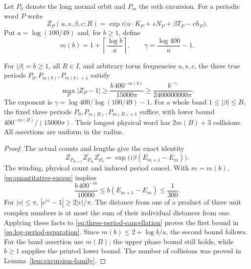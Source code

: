 Let $P_0$ denote the long normal orbit and $P_m$ the $m$th excursion.
For a periodic word $P$ write
\[
 Z_P(u,s,\beta,c;R)
 =\exp i\bigl(u\cdot K_P+sN_P+\beta T_P-ch_P\bigr).
\]
Put $a=\log(100/49)$ and, for $b\ge1$, define
\begin{equation}\label{eq:frequency-period-budget}
 m(b)=1+\left\lceil\frac{\log b}{a}\right\rceil,
 \qquad \gamma=\frac{\log400}{a}-1.
\end{equation}

\begin{theorem}
\label{thm:log-period-separation}
For $|\beta|=b\ge1$, all $R\in I$, and arbitrary torus
frequencies $u,s,c$, the three true periods $P_0,P_{m(b)},P_{m(b)+1}$
satisfy
\begin{equation}\label{eq:log-period-separation}
 \max_P|Z_P-1|
 \ge\frac{b\,400^{-m(b)}}{15000\pi}
 \ge\frac{b^{-\gamma}}{2400000000\pi}.
\end{equation}
The exponent is $\gamma=\log400/\log(100/49)-1$.
For a whole band $1\le|\beta|\le B$, the fixed three periods
$P_0,P_{m(B)},P_{m(B)+1}$ suffice, with lower bound
$400^{-m(B)}/(15000\pi)$. Their longest physical word has
$2m(B)+3$ collisions. All assertions are uniform in the radius.
\end{theorem}
\begin{proof}
The actual counts and lengths give the exact identity
\begin{equation}\label{eq:three-period-cancellation}
 Z_{P_{m+1}}\overline{Z_{P_m}}\overline{Z_{P_0}}
       =\exp\bigl(i\beta(E_{m+1}-E_m)\bigr).
\end{equation}
The winding, physical count and induced period cancel. With $m=m(b)$,
\eqref{eq:quantitative-excess} implies
\[
 \frac{b\,400^{-m}}{10000}
 \le b(E_{m+1}-E_m)\le\frac1{300}.
\]
For $|v|\le\pi$, $|e^{iv}-1|\ge2|v|/\pi$. The distance
from one of a product of three unit complex numbers is at most
the sum of their individual distances from one. Applying these
facts to \eqref{eq:three-period-cancellation} proves the first
bound in \eqref{eq:log-period-separation}. Since
$m(b)\le2+\log b/a$, the second bound follows. For the band
assertion use $m(B)$; the upper phase bound still holds, while
$b\ge1$ supplies the printed lower bound. The number of collisions
was proved in Lemma~\ref{lem:excursion-family}.
\end{proof}

